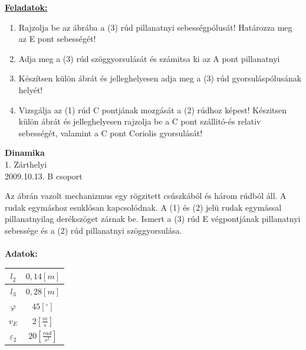 \documentclass[11pt,a4paper]{article}
\begin{document}
\vspace{2em}
\underline{\textbf{Feladatok:}}
\begin{enumerate}
    \item Rajzolja be az ábrába a (3) rúd pillanatnyi sebességpólusát! Határozza meg az E pont
    sebességét!
    \item Adja meg a (3) rúd szöggyorsulását és számitsa ki az A pont pillanatnyi
    \item Készítsen külön ábrát és jelleghelyesen adja meg a (3) rúd gyorsuláspólusának helyét!
    \item Vizsgálja az (1) rúd C pontjának mozgását a (2) rúdhoz képest! Készitsen külön ábrát és
    jelleghelyesen rajzolja be a C pont szállitó-és relativ sebességét, valamint a C pont
    Coriolis gyorsulását!
\end{enumerate}


\newpage

\begin{center}
    \textbf{\LARGE{Dinamika}}\\
    1. Zárthelyi\\
    2009.10.13. B csoport
\end{center}
Az ábrán vazolt mechanizmus egy rögzitett csúszkából és három rúdból áll. A rudak egymáshoz
esuklósan kapcsolódnak. A (1) és (2) jelü rudak egymással pillanatnyilag derékszöget zárnak be.
Ismert a (3) rúd E végpontjának pillanatnyi sebessége és a (2) rúd pillanatnyi szöggyorsulása.\\\\




\textbf{Adatok:}\\
\begin{tabular}{| c | c |}
    \hline
    $l_2 $&$ 0,14 [m]$\\
    \hline
    $l_3$&$ 0,28 [m]$\\
    \hline
    $\varphi $&$ 45 [^\circ]$\\ 
    \hline
    $v_E $&$ 2 \left[\frac{m}{s}\right]$\\
    \hline
    $\varepsilon_2 $&$ 20 \left[\frac{rad}{s^2}\right]$\\
    \hline
\end{tabular}
\end{document}
